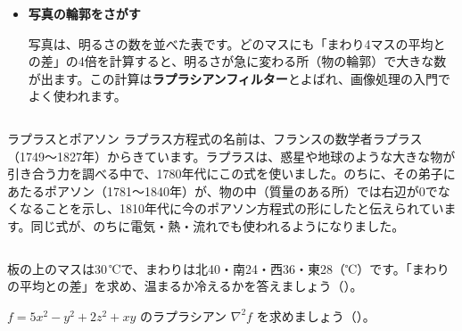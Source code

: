 \begin{butsuri}
\begin{itemize}[leftmargin=1.2\zw, itemsep=3pt, topsep=0pt, label={\color{\bkTT}●}]
\begin{minipage}[c]{0.22\linewidth}
\end{minipage}
\item \textbf{写真の輪郭をさがす}\par\vspace{2pt}\noindent\begin{minipage}[c]{0.74\linewidth}\raggedright
写真は、明るさの数を並べた表です。どのマスにも「まわり4マスの平均との差」の4倍を計算すると、明るさが急に変わる所（物の輪郭）で大きな数が出ます。この計算は\textbf{ラプラシアンフィルター}とよばれ、画像処理の入門でよく使われます。
\end{minipage}\hfill
\begin{minipage}[c]{0.22\linewidth}\centering
{}
\end{minipage}
\end{itemize}
\end{butsuri}

\begin{column}{ラプラスとポアソン}
ラプラス方程式の名前は、フランスの数学者ラプラス（1749〜1827年）からきています。ラプラスは、惑星や地球のような大きな物が引き合う力を調べる中で、1780年代にこの式を使いました。のちに、その弟子にあたるポアソン（1781〜1840年）が、物の中（質量のある所）では右辺が0でなくなることを示し、1810年代に今のポアソン方程式の形にしたと伝えられています。同じ式が、のちに電気・熱・流れでも使われるようになりました。
\end{column}

\bkendproblems
{}

\bkproblem 板の上のマスは30\,℃で、まわりは北40・南24・西36・東28（℃）です。「まわりの平均との差」を求め、温まるか冷えるかを答えましょう\mbox{（）}。

\bkproblem $f=5x^2-y^2+2z^2+xy$ のラプラシアン $\nabla^2f$ を求めましょう\mbox{（）}。

